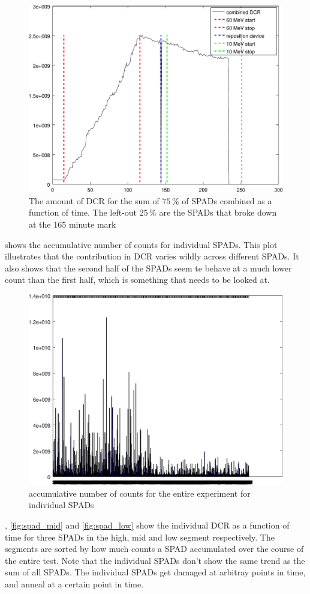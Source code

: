 \begin{figure}[h]
\centering
	\includegraphics[width=0.6\linewidth]{fig/count_vs_time_sum_some.pdf}
\caption{The amount of DCR for the sum of $75\,\%$ of SPADs combined as a function of time. The left-out $25\,\%$ are the SPADs that broke down at the 165 minute mark}
\label{fig:count_vs_time_sum_some}
\end{figure}

 shows the accumulative number of counts for individual SPADs. This plot illustrates that the contribution in DCR varies wildly across different SPADs. It also shows that the second half of the SPADs seem te behave at a much lower count than the first half, which is something that needs to be looked at.

\begin{figure}[h]
\centering
	\includegraphics[width=0.6\linewidth]{fig/bars.pdf}
\caption{accumulative number of counts for the entire experiment for individual SPADs}
\label{fig:bars}
\end{figure}

, \cref{fig:spad_mid} and \cref{fig:spad_low} show the individual DCR as a function of time for three SPADs in the high, mid and low segment respectively. The segments are sorted by how much counts a SPAD accumulated over the course of the entire test. Note that the individual SPADs don't show the same trend as the sum of all SPADs. The individual SPADs get damaged at arbitray points in time, and anneal at a certain point in time. 


